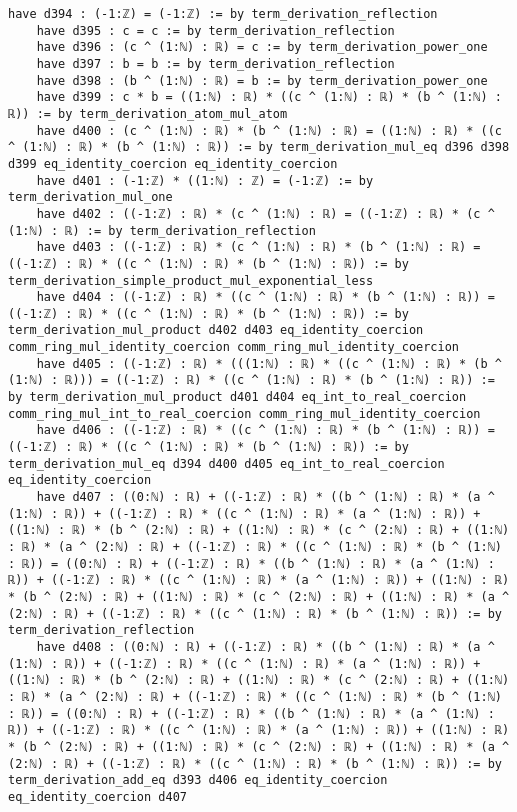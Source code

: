 \documentclass{article}
\begin{document}
\begin{tcolorbox}[colback=white!10, width=\linewidth]
\begin{lstlisting}[language=Lean4]
    have d394 : (-1:ℤ) = (-1:ℤ) := by term_derivation_reflection
    have d395 : c = c := by term_derivation_reflection
    have d396 : (c ^ (1:ℕ) : ℝ) = c := by term_derivation_power_one
    have d397 : b = b := by term_derivation_reflection
    have d398 : (b ^ (1:ℕ) : ℝ) = b := by term_derivation_power_one
    have d399 : c * b = ((1:ℕ) : ℝ) * ((c ^ (1:ℕ) : ℝ) * (b ^ (1:ℕ) : ℝ)) := by term_derivation_atom_mul_atom
    have d400 : (c ^ (1:ℕ) : ℝ) * (b ^ (1:ℕ) : ℝ) = ((1:ℕ) : ℝ) * ((c ^ (1:ℕ) : ℝ) * (b ^ (1:ℕ) : ℝ)) := by term_derivation_mul_eq d396 d398 d399 eq_identity_coercion eq_identity_coercion
    have d401 : (-1:ℤ) * ((1:ℕ) : ℤ) = (-1:ℤ) := by term_derivation_mul_one
    have d402 : ((-1:ℤ) : ℝ) * (c ^ (1:ℕ) : ℝ) = ((-1:ℤ) : ℝ) * (c ^ (1:ℕ) : ℝ) := by term_derivation_reflection
    have d403 : ((-1:ℤ) : ℝ) * (c ^ (1:ℕ) : ℝ) * (b ^ (1:ℕ) : ℝ) = ((-1:ℤ) : ℝ) * ((c ^ (1:ℕ) : ℝ) * (b ^ (1:ℕ) : ℝ)) := by term_derivation_simple_product_mul_exponential_less
    have d404 : ((-1:ℤ) : ℝ) * ((c ^ (1:ℕ) : ℝ) * (b ^ (1:ℕ) : ℝ)) = ((-1:ℤ) : ℝ) * ((c ^ (1:ℕ) : ℝ) * (b ^ (1:ℕ) : ℝ)) := by term_derivation_mul_product d402 d403 eq_identity_coercion comm_ring_mul_identity_coercion comm_ring_mul_identity_coercion
    have d405 : ((-1:ℤ) : ℝ) * (((1:ℕ) : ℝ) * ((c ^ (1:ℕ) : ℝ) * (b ^ (1:ℕ) : ℝ))) = ((-1:ℤ) : ℝ) * ((c ^ (1:ℕ) : ℝ) * (b ^ (1:ℕ) : ℝ)) := by term_derivation_mul_product d401 d404 eq_int_to_real_coercion comm_ring_mul_int_to_real_coercion comm_ring_mul_identity_coercion
    have d406 : ((-1:ℤ) : ℝ) * ((c ^ (1:ℕ) : ℝ) * (b ^ (1:ℕ) : ℝ)) = ((-1:ℤ) : ℝ) * ((c ^ (1:ℕ) : ℝ) * (b ^ (1:ℕ) : ℝ)) := by term_derivation_mul_eq d394 d400 d405 eq_int_to_real_coercion eq_identity_coercion
    have d407 : ((0:ℕ) : ℝ) + ((-1:ℤ) : ℝ) * ((b ^ (1:ℕ) : ℝ) * (a ^ (1:ℕ) : ℝ)) + ((-1:ℤ) : ℝ) * ((c ^ (1:ℕ) : ℝ) * (a ^ (1:ℕ) : ℝ)) + ((1:ℕ) : ℝ) * (b ^ (2:ℕ) : ℝ) + ((1:ℕ) : ℝ) * (c ^ (2:ℕ) : ℝ) + ((1:ℕ) : ℝ) * (a ^ (2:ℕ) : ℝ) + ((-1:ℤ) : ℝ) * ((c ^ (1:ℕ) : ℝ) * (b ^ (1:ℕ) : ℝ)) = ((0:ℕ) : ℝ) + ((-1:ℤ) : ℝ) * ((b ^ (1:ℕ) : ℝ) * (a ^ (1:ℕ) : ℝ)) + ((-1:ℤ) : ℝ) * ((c ^ (1:ℕ) : ℝ) * (a ^ (1:ℕ) : ℝ)) + ((1:ℕ) : ℝ) * (b ^ (2:ℕ) : ℝ) + ((1:ℕ) : ℝ) * (c ^ (2:ℕ) : ℝ) + ((1:ℕ) : ℝ) * (a ^ (2:ℕ) : ℝ) + ((-1:ℤ) : ℝ) * ((c ^ (1:ℕ) : ℝ) * (b ^ (1:ℕ) : ℝ)) := by term_derivation_reflection
    have d408 : ((0:ℕ) : ℝ) + ((-1:ℤ) : ℝ) * ((b ^ (1:ℕ) : ℝ) * (a ^ (1:ℕ) : ℝ)) + ((-1:ℤ) : ℝ) * ((c ^ (1:ℕ) : ℝ) * (a ^ (1:ℕ) : ℝ)) + ((1:ℕ) : ℝ) * (b ^ (2:ℕ) : ℝ) + ((1:ℕ) : ℝ) * (c ^ (2:ℕ) : ℝ) + ((1:ℕ) : ℝ) * (a ^ (2:ℕ) : ℝ) + ((-1:ℤ) : ℝ) * ((c ^ (1:ℕ) : ℝ) * (b ^ (1:ℕ) : ℝ)) = ((0:ℕ) : ℝ) + ((-1:ℤ) : ℝ) * ((b ^ (1:ℕ) : ℝ) * (a ^ (1:ℕ) : ℝ)) + ((-1:ℤ) : ℝ) * ((c ^ (1:ℕ) : ℝ) * (a ^ (1:ℕ) : ℝ)) + ((1:ℕ) : ℝ) * (b ^ (2:ℕ) : ℝ) + ((1:ℕ) : ℝ) * (c ^ (2:ℕ) : ℝ) + ((1:ℕ) : ℝ) * (a ^ (2:ℕ) : ℝ) + ((-1:ℤ) : ℝ) * ((c ^ (1:ℕ) : ℝ) * (b ^ (1:ℕ) : ℝ)) := by term_derivation_add_eq d393 d406 eq_identity_coercion eq_identity_coercion d407

\end{lstlisting}
\end{tcolorbox}
\end{document}
